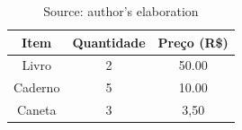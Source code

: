 ﻿\begin{table}[hbt!]
    \centering
    \caption{Título da tabela}
    \begin{tabular}{ccc}
        \hline
        \textbf{Item} & \textbf{Quantidade} & \textbf{Preço (R\$)} \\  
        \hline
        Livro        & 2       & 50.00  \\  
        Caderno      & 5       & 10.00  \\  
        Caneta       & 3       & 3,50   \\  
        \hline
    \end{tabular}
    \caption*{Source: author's elaboration}
    \label{tab:exemplo}
\end{table}

